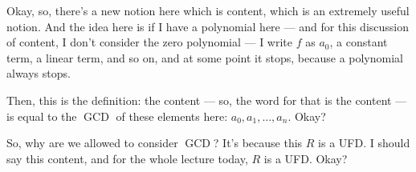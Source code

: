 \begin{speech}[00:01:51 - 00:02:55]
Okay, so, there's a new notion here which is content, which is an extremely useful notion.  And the idea here is if I have a polynomial here --- and for this discussion of content, I don't consider the zero polynomial  --- I write $f$ as $a_0$, a constant term, a linear term, and so on, and at some point it stops, because a polynomial always stops. 

Then, this is the definition: the content --- so, the word for that is the content --- is equal to the $\operatorname{GCD}$ of these elements here: $a_0, a_1, \dots, a_n$.  Okay?

So, why are we allowed to consider $\operatorname{GCD}$? It's because this $R$ is a UFD. I should say this content, and for the whole lecture today, $R$ is a UFD.  Okay?
\end{speech}

\begin{content}
\end{content}

